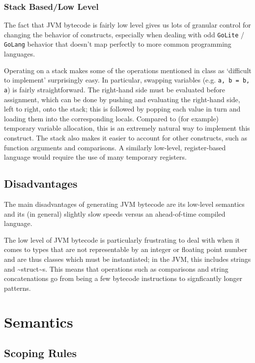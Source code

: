 \documentclass[11pt]{article}
\begin{document}
\subsubsection{Stack Based/Low Level}
\label{sec:org3b8ffc9}
The fact that JVM bytecode is fairly low level gives us lots of granular
control for changing the behavior of constructs, especially when
dealing with odd \texttt{GoLite} / \texttt{GoLang} behavior that doesn't
map perfectly to more common programming languages.

Operating on a stack makes some of the operations mentioned in class as
`difficult to implement' surprisingly easy. In particular, swapping
variables (e.g. \texttt{a, b = b, a}) is fairly straightforward. The right-hand
side must be evaluated before assignment, which can be done by pushing and
evaluating the right-hand side, left to right, onto the stack; this is
followed by popping each value in turn and loading them into the
corresponding locals. Compared to (for example) temporary variable
allocation, this is an extremely natural way to implement this construct.
The stack also makes it easier to account for other constructs, such as
function arguments and comparisons. A similarly low-level, register-based
language would require the use of many temporary registers.

\subsection{Disadvantages}
\label{sec:org49e3c3b}
The main disadvantages of generating JVM bytecode are its low-level semantics
and its (in general) slightly slow speeds versus an ahead-of-time compiled
language.

The low level of JVM bytecode is particularly frustrating to deal with when
it comes to types that are not representable by an integer or floating point
number and are thus classes which must be instantiated; in the JVM, this
includes strings and \textasciitilde{}struct\textasciitilde{}s. This means that operations such as
comparisons and string concatenations go from being a few bytecode
instructions to signficantly longer patterns.
\section{Semantics}
\label{sec:org79dd5d7}
\subsection{Scoping Rules}
\label{sec:org069a3e1}
\end{document}
